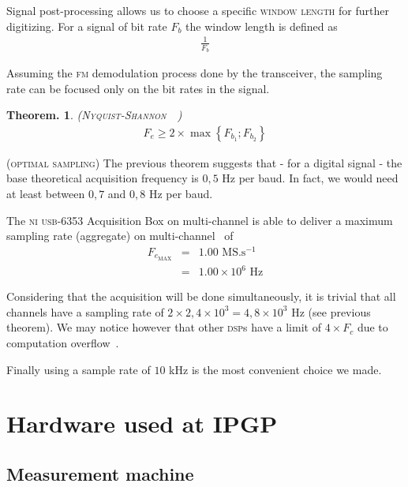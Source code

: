 \documentclass[a4paper]{report}
\newtheorem{theorem}{Theorem.}[section]
\newenvironment{remark}[1][Remark.]{\begin{trivlist}
\item[\hskip \labelsep {\bfseries #1}]}{\end{trivlist}}
\begin{document}
Signal post-processing allows us to choose a specific \textsc{window length} for further digitizing. For a signal of bit rate $F_b$ the window length is defined as
\begin{eqnarray*}
  \frac{1}{F_b}
\end{eqnarray*}

Assuming the \textsc{fm} demodulation process done by the transceiver, the sampling rate can be focused only on the bit rates in the signal.
\begin{theorem} (\textsc{Nyquist-Shannon}~\cite{Nyquist}~\cite{Shannon})
  \begin{eqnarray}
    F_e \geq 2 \times \operatorname{max} \left \{ F_{b_1} ; F_{b_2} \right \}
  \end{eqnarray}
\end{theorem}

\begin{remark}
  \textsc{(optimal sampling)}
  The previous theorem suggests that - for a digital signal - the base theoretical acquisition frequency is $0,5$ Hz per baud. In fact, we would need at least between $0,7$ and $0,8$ Hz per baud\cite{FV}.
\end{remark}

The \textsc{ni usb-6353} Acquisition Box on multi-channel is able to deliver a maximum sampling rate (aggregate) on multi-channel~\cite{NI_6353_datasheet} of
\begin{eqnarray*}
  F_{e_{\text{MAX}}} &=& 1.00 \text{ MS.s$^{-1}$}\\
                &=& 1.00 \times 10^6 \text{ Hz}
\end{eqnarray*}

Considering that the acquisition will be done simultaneously, it is trivial that all channels have a sampling rate of $2 \times 2,4 \times 10^3 = 4,8 \times 10^3$ Hz (see previous theorem). We may notice however that other \textsc{dsp}s have a limit of $4 \times F_c$ due to computation overflow~\cite{TI_MSP430}.

Finally using a sample rate of $10$ kHz is the most convenient choice we made.


\chapter{Hardware used at IPGP}

\section{Measurement machine}
\end{document}
